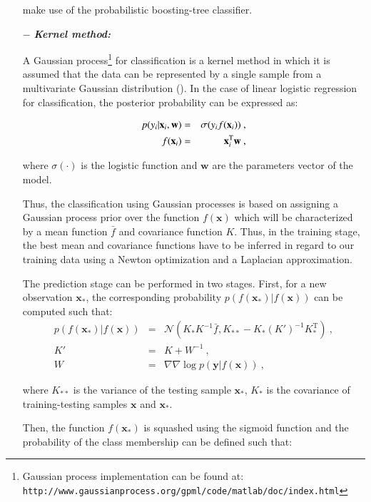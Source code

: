 \begin{enumerate}[leftmargin=*]
\cite{Tiwari2009a,Tiwari2012,Tiwari2010,Viswanath2011} make use of the probabilistic boosting-tree classifier.

\item[$-$] \textbf{\textit{Kernel method:}}

A Gaussian process\footnote{Gaussian process implementation can be found at: \texttt{http://www.\allowbreak gaussianprocess.org/gpml/code/matlab/doc/index.html}} for classification is a kernel method in which it is assumed that the data can be represented by a single sample from a multivariate Gaussian distribution (\cite{Rasmussen2005}). In the case of linear logistic regression for classification, the posterior probability can be expressed as:

\begin{eqnarray}
\centering
	p(y_i|\mathbf{x}_i,\mathbf{w}) & = & \sigma(y_i f(\mathbf{x}_i)) \ , \label{eq:gp1} \\
	f(\mathbf{x}_i) & = & \mathbf{x}_i^{\text{T}} \mathbf{w} \ , \nonumber
\end{eqnarray}

\noindent where $\sigma(\cdot)$ is the logistic function and $\mathbf{w}$ are the parameters vector of the model.

Thus, the classification using Gaussian processes is based on assigning a Gaussian process prior over the function $f(\mathbf{x})$ which will be characterized by a mean function $\bar{f}$ and covariance function $K$. Thus, in the training stage, the best mean and covariance functions have to be inferred in regard to our training data using a Newton optimization and a Laplacian approximation.

The prediction stage can be performed in two stages. First, for a new observation $\mathbf{x}_*$, the corresponding probability $p(f(\mathbf{x}_*)|f(\mathbf{x}))$ can be computed such that:
\begin{eqnarray}
	p(f(\mathbf{x}_*)|f(\mathbf{x})) & = & \mathcal{N}( K_*K^{-1}\bar{f}, K_{**}-K_*(K')^{-1}K_*^{\text{T}} ) \ , \nonumber \\
	K' & = & K + W^{-1} \ , \label{eq:gp2} \\
	W & = & \nabla \nabla \log p(\mathbf{y}|f(\mathbf{x})) \ , \nonumber
\end{eqnarray}

\noindent where $K_{**}$ is the variance of the testing sample $\mathbf{x}_*$, $K_{*}$ is the covariance of training-testing samples $\mathbf{x}$ and $\mathbf{x}_*$.

Then, the function $f(\mathbf{x}_*)$ is squashed using the sigmoid function and the probability of the class membership can be defined such that:


\end{enumerate}
